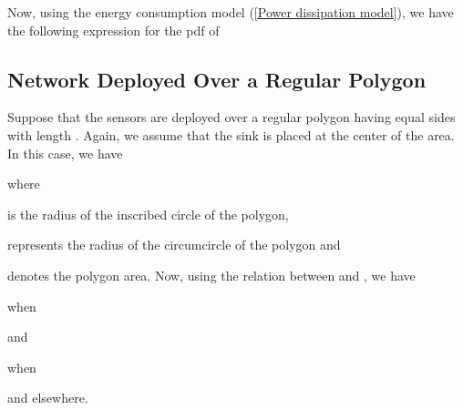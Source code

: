 \documentclass[conference]{IEEEtran}
\begin{document}
Now, using the energy consumption model (\ref{Power dissipation
model}), we have the following expression for the pdf of 


\subsection{Network Deployed Over a Regular Polygon}
Suppose that the sensors are deployed over a regular polygon having
 equal sides with length . Again, we assume that the sink is
placed at the center of the area. In this case, we have

where

is the radius of the inscribed circle of the polygon,

represents the radius of the circumcircle of the polygon and

denotes the polygon area. Now, using the relation between  and
, we have

when

and

when

and  elsewhere.
\end{document}
